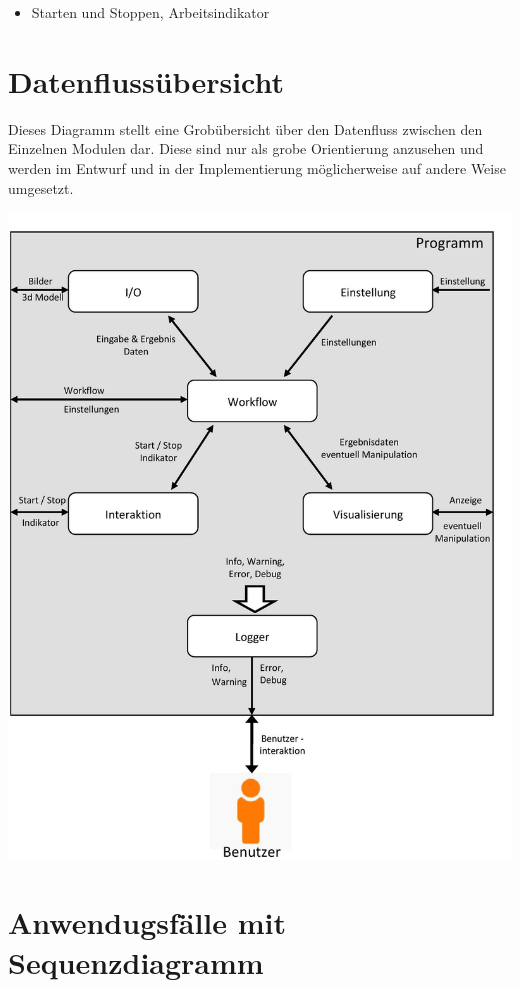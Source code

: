 \begin{itemize}
\item Starten und Stoppen, Arbeitsindikator 
\end{itemize}

\newpage 
\section{Datenflussübersicht}

Dieses Diagramm stellt eine Grobübersicht über den Datenfluss zwischen den Einzelnen Modulen dar.
Diese sind nur als grobe Orientierung anzusehen und werden im Entwurf und in der Implementierung möglicherweise auf andere Weise umgesetzt.
\begin{normalsize}

\end{normalsize}
\includegraphics[scale=0.5]{img/Datenflussuebersicht.jpg} 
\newpage 
\section{Anwendugsfälle mit Sequenzdiagramm}
